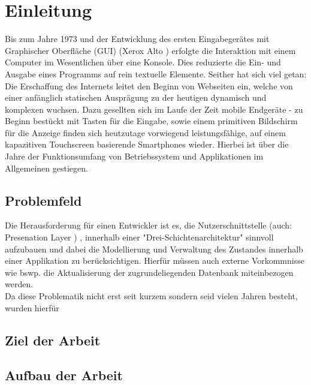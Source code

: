 \section{Einleitung}
\label{sec:einleitung}

Bis zum Jahre 1973 und der Entwicklung des ersten Eingabegerätes mit Graphischer Oberfläche (GUI) (Xerox Alto \cite{xeroxAlto}) erfolgte die Interaktion mit einem Computer im Wesentlichen über eine Konsole. Dies reduzierte die Ein- und Ausgabe eines Programms auf rein textuelle Elemente. Seither hat sich viel getan: Die Erschaffung des Internets leitet den Beginn von Webseiten ein, welche von einer anfänglich statischen Ausprägung zu der heutigen dynamisch und komplexen wuchsen. Dazu gesellten sich im Laufe der Zeit mobile Endgeräte - zu Beginn bestückt mit Tasten für die Eingabe, sowie einem primitiven Bildschirm für die Anzeige finden sich heutzutage vorwiegend leistungsfähige, auf einem kapazitiven Touchscreen basierende Smartphones wieder. Hierbei ist über die Jahre der Funktionsumfang von Betriebssystem und Applikationen im Allgemeinen gestiegen.

\subsection{Problemfeld}
\label{sec:problemfeld}
Die Herausforderung für einen Entwickler ist es, die Nutzerschnittstelle (auch: Presenation Layer \cite{presentationLayerpatternsOfEnterpriseApplicationArchitectureMartinFowler}) ,
innerhalb einer "Drei-Schichtenarchitektur"
\cite{threeTierArchitectureDonaldWolfe2013}
sinnvoll aufzubauen und dabei die Modellierung und Verwaltung des Zustandes innerhalb einer Applikation zu berücksichtigen. Hierfür müssen auch externe Vorkommnisse wie bswp. die Aktualisierung der zugrundeliegenden Datenbank miteinbezogen werden.
\\
Da diese Problematik nicht erst seit kurzem sondern seid vielen Jahren besteht, wurden hierfür 

\subsection{Ziel der Arbeit}
\label{sec:ziel-der-arbeit}

\subsection{Aufbau der Arbeit}
\label{sec:aufbau-der-arbeit}
